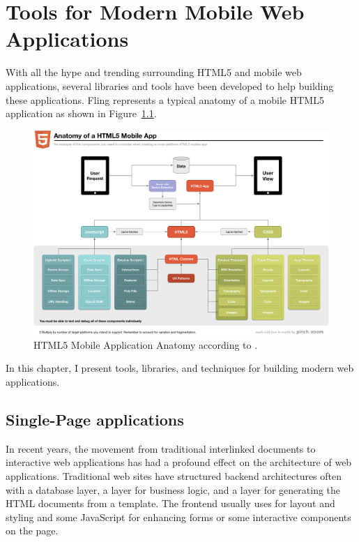 \chapter{Tools for Modern Mobile Web Applications}
\label{chapter:tools-and-techniques}

With all the hype and trending surrounding HTML5 and mobile web
applications, several libraries and tools have been developed to help
building these applications. Fling \cite{fling2011anatomy} represents
a typical anatomy of a mobile HTML5 application as shown in
Figure~\ref{figure:anatomy-of-a-html5-mobile-app.png}.

\begin{figure}[h!]
  \includegraphics[width=\textwidth]{images/anatomy-of-a-html5-mobile-app.png}
  \caption{HTML5 Mobile Application Anatomy according to
    \cite{fling2011anatomy}.}
  \label{figure:anatomy-of-a-html5-mobile-app.png}
\end{figure}

In this chapter, I present tools, libraries, and techniques for
building modern web applications.

\section{Single-Page applications}
\label{section:single-page-applications}

In recent years, the movement from traditional interlinked documents
to interactive web applications has had a profound effect on the
architecture of web applications. Traditional web sites have
structured backend architectures often with a database layer, a layer
for business logic, and a layer for generating the HTML documents from
a template. The frontend usually uses  for layout and
styling and some JavaScript for enhancing forms or some interactive
components on the page.

